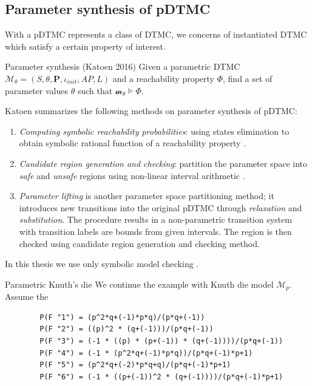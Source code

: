 \subsection{Parameter synthesis of pDTMC}
With a pDTMC represents a class of DTMC, we concerns of instantiated DTMC which satisfy a certain property of interest.
\begin{definition}{Parameter synthesis (Katoen 2016)\cite{katoen2016probabilistic}} Given a
    parametric DTMC $\mathcal{M}_\theta = (S, \theta, \mathbf{P}, \iota_{init}, AP, L)$ and a
    reachability property $\Phi$, find a set of parameter values $\theta$ such that
    $\mathcal{m}_\theta \models \Phi$.
\end{definition}
Katoen \cite{katoen2013model} summarizes the following methods on parameter synthesis of pDTMC:
\begin{enumerate}
    \item \textit{Computing symbolic reachability probabilities}: using states elimination to obtain symbolic
          rational function of a reachability property \cite{daws2004symbolic}
          \cite{hahn2011probabilistic}.
    \item \textit{Candidate region generation and checking}: partition the parameter space into \textit{safe}
          and \textit{unsafe} regions using non-linear interval arithmetic
          \cite{kwiatkowska2006symmetry}.
    \item \textit{Parameter lifting} is another parameter space partitioning method; it introduces
          new transitions into the original pDTMC through \textit{relaxation} and
          \textit{substitution}. The procedure results in a non-parametric transition system with
          transition labels are bounds from given intervals. The region is then checked using
          candidate region generation and checking method.
\end{enumerate}
In this thesis we use only symbolic model checking \cite{daws2004symbolic}.
\begin{example}{Parametric Knuth's die}
    We continue the example with Knuth die model $\mathcal{M}_{p}$. Assume the
    \begin{lstlisting}
        P(F "1") = (p^2*q+(-1)*p*q)/(p*q+(-1))
        P(F "2") = ((p)^2 * (q+(-1)))/(p*q+(-1))
        P(F "3") = (-1 * ((p) * (p+(-1)) * (q+(-1))))/(p*q+(-1))
        P(F "4") = (-1 * (p^2*q+(-1)*p*q))/(p*q+(-1)*p+1)
        P(F "5") = (p^2*q+(-2)*p*q+q)/(p*q+(-1)*p+1)
        P(F "6") = (-1 * ((p+(-1))^2 * (q+(-1))))/(p*q+(-1)*p+1)
    \end{lstlisting}
\end{example}
